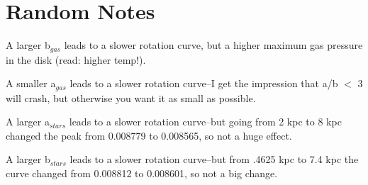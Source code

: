 \documentclass[12pt,preprint]{aastex}
\begin{document}
\section{Random Notes}

A larger b$_{gas}$ leads to a slower rotation curve, but a higher maximum gas pressure in the disk (read:  higher temp!).  

A smaller a$_{gas}$ leads to a slower rotation curve--I get the impression that a/b $<$ 3 will crash, but otherwise you want it as small as possible.  

A larger a$_{stars}$ leads to a slower rotation curve--but going from 2 kpc to 8 kpc changed the peak from 0.008779 to 0.008565, so not a huge effect.  

A larger b$_{stars}$ leads to a slower rotation curve--but from .4625 kpc to 7.4 kpc the curve changed from 0.008812 to 0.008601, so not a big change.  
\end{document}
